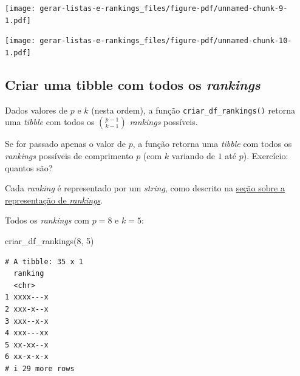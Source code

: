 \documentclass[
  letterpaper,
  DIV=11,
  numbers=noendperiod]{scrreprt}
\newenvironment{Shaded}{\begin{snugshade}}{\end{snugshade}}
\newcommand{\DecValTok}[1]{\textcolor[rgb]{0.68,0.00,0.00}{#1}}
\newcommand{\FunctionTok}[1]{\textcolor[rgb]{0.28,0.35,0.67}{#1}}
\newcommand{\NormalTok}[1]{\textcolor[rgb]{0.00,0.23,0.31}{#1}}
\newcommand{\SpecialCharTok}[1]{\textcolor[rgb]{0.37,0.37,0.37}{#1}}
\begin{document}
\begin{center}
\texttt{[image: gerar-listas-e-rankings\_files/figure-pdf/unnamed-chunk-9-1.pdf]}
\end{center}

\begin{Shaded}
\end{Shaded}

\begin{center}
\texttt{[image: gerar-listas-e-rankings\_files/figure-pdf/unnamed-chunk-10-1.pdf]}
\end{center}

\subsection{\texorpdfstring{Criar uma tibble com todos os
\emph{rankings}}{Criar uma tibble com todos os rankings}}\label{criar-uma-tibble-com-todos-os-rankings}

Dados valores de $p$ e $k$ (nesta ordem), a função
\texttt{criar\_df\_rankings()} retorna uma \emph{tibble} com todos os
$\binom{p - 1}{k - 1}$ \emph{rankings} possíveis.

Se for passado apenas o valor de $p$, a função retorna uma \emph{tibble}
com todos os \emph{rankings} possíveis de comprimento $p$ (com $k$
variando de $1$ até $p$). Exercício: quantos são?

Cada \emph{ranking} é representado por um \emph{string}, como descrito
na \hyperref[sec-repr]{seção sobre a representação de \emph{rankings}}.

Todos os \emph{rankings} com $p = 8$ e $k = 5$:

\begin{Shaded}
\begin{Highlighting}[]
\FunctionTok{criar\_df\_rankings}\NormalTok{(}\DecValTok{8}\NormalTok{, }\DecValTok{5}\NormalTok{)}
\end{Highlighting}
\end{Shaded}

\begin{verbatim}
# A tibble: 35 x 1
  ranking 
  <chr>   
1 xxxx---x
2 xxx-x--x
3 xxx--x-x
4 xxx---xx
5 xx-xx--x
6 xx-x-x-x
# i 29 more rows
\end{verbatim}
\end{document}

